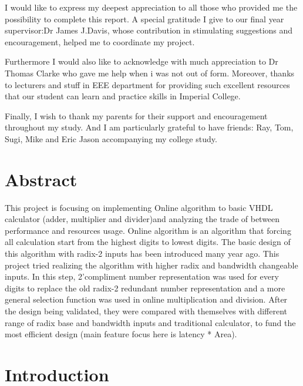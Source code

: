 \documentclass[10pt]{article}
\begin{document}
{\Large I would like to express my deepest appreciation to all those who provided me the possibility to complete this report. A special gratitude I give to our final year supervisor:Dr James J.Davis, whose contribution in stimulating suggestions and encouragement, helped me to coordinate my project.

Furthermore I would also like to acknowledge with much appreciation to Dr Thomas Clarke who gave me help when i was not out of form. Moreover, thanks to lecturers and stuff in EEE department for providing such excellent resources that our student can learn and practice skills in Imperial College. 

Finally, I wish to thank my parents for their support and encouragement throughout my study. And I am particularly grateful to have friends: Ray, Tom, Sugi, Mike and Eric Jason accompanying my college study.}

\newpage
\section{Abstract}

This project is focusing on implementing Online algorithm to basic VHDL calculator (adder, multiplier and divider)and analyzing the trade of between performance and resources usage. Online algorithm is an algorithm that forcing all calculation start from the highest digits to lowest digits. The basic design of this algorithm with radix-2 inputs has been introduced many year ago. This project tried realizing the algorithm with higher radix and bandwidth changeable inputs. In this step, 2’compliment number representation was used for every digits to replace the old radix-2 redundant number  representation and a more general selection function was used in online multiplication and division. After the design being validated, they were compared with themselves with different range of radix base and bandwidth inputs and traditional calculator, to fund the most efficient design (main feature focus here is latency * Area).

\section{Introduction}
    
\end{document}
